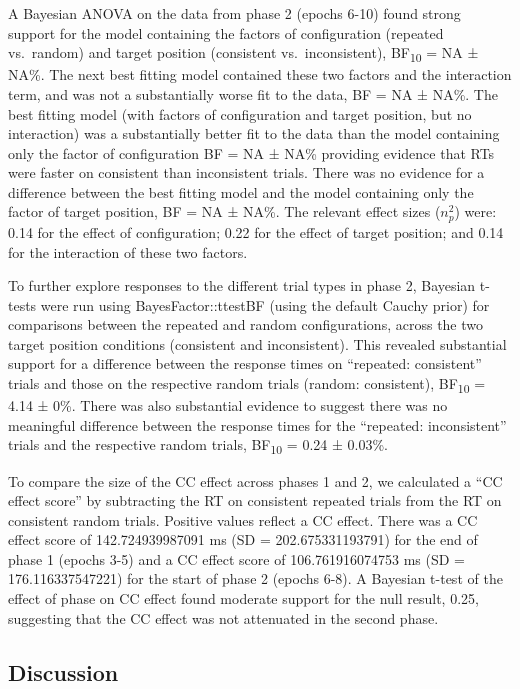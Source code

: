 \documentclass[
  man,
  floatsintext,
  longtable,
  nolmodern,
  notxfonts,
  notimes,
  colorlinks=true,linkcolor=blue,citecolor=blue,urlcolor=blue]{apa7}
\begin{document}
A Bayesian ANOVA on the data from phase 2 (epochs 6-10) found strong
support for the model containing the factors of configuration (repeated
vs.~random) and target position (consistent vs.~inconsistent),
BF\textsubscript{10} = NA ± NA\%. The next best fitting model contained
these two factors and the interaction term, and was not a substantially
worse fit to the data, BF = NA ± NA\%. The best fitting model (with
factors of configuration and target position, but no interaction) was a
substantially better fit to the data than the model containing only the
factor of configuration BF = NA ± NA\% providing evidence that RTs were
faster on consistent than inconsistent trials. There was no evidence for
a difference between the best fitting model and the model containing
only the factor of target position, BF = NA ± NA\%. The relevant effect
sizes (\(n^2_p\)) were: 0.14 for the effect of configuration; 0.22 for
the effect of target position; and 0.14 for the interaction of these two
factors.

To further explore responses to the different trial types in phase 2,
Bayesian t-tests were run using BayesFactor::ttestBF (using the default
Cauchy prior) for comparisons between the repeated and random
configurations, across the two target position conditions (consistent
and inconsistent). This revealed substantial support for a difference
between the response times on ``repeated: consistent'' trials and those
on the respective random trials (random: consistent),
BF\textsubscript{10} = 4.14 ± 0\%. There was also substantial evidence
to suggest there was no meaningful difference between the response times
for the ``repeated: inconsistent'' trials and the respective random
trials, BF\textsubscript{10} = 0.24 ± 0.03\%.

To compare the size of the CC effect across phases 1 and 2, we
calculated a ``CC effect score'' by subtracting the RT on consistent
repeated trials from the RT on consistent random trials. Positive values
reflect a CC effect. There was a CC effect score of 142.724939987091 ms
(SD = 202.675331193791) for the end of phase 1 (epochs 3-5) and a CC
effect score of 106.761916074753 ms (SD = 176.116337547221) for the
start of phase 2 (epochs 6-8). A Bayesian t-test of the effect of phase
on CC effect found moderate support for the null result, 0.25,
suggesting that the CC effect was not attenuated in the second phase.

\subsection{Discussion}\label{discussion}
\end{document}
